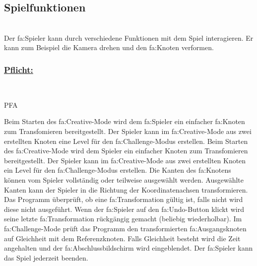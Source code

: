 %
%


\subsection{Spielfunktionen}

%
%
\renewcommand{\K}{}
%
%

~\\
Der \gls{fa:Spieler} kann durch verschiedene Funktionen mit dem Spiel interagieren. Er kann zum Beispiel die Kamera drehen und den \gls{fa:Knoten} verformen. 
\\

%
%
\subsubsection*{\underline{Pflicht:}}~\\

\begin{ids}{\gls{PFA\K}}

	\id[ 90] Beim Starten des \gls{fa:Creative}-Mode wird dem \gls{fa:Spieler} ein einfacher \gls{fa:Knoten} zum Transfomieren bereitgestellt.
 	\id[100] Der Spieler kann im \gls{fa:Creative}-Mode aus zwei erstellten Knoten eine Level für den \gls{fa:Challenge}-Modus erstellen.
 	\id[ 110] Beim Starten des \gls{fa:Creative}-Mode wird dem Spieler ein einfacher Knoten  zum Transfomieren bereitgestellt.
 	\id[ 120] Der Spieler kann im \gls{fa:Creative}-Mode aus zwei erstellten Knoten ein Level für den \gls{fa:Challenge}-Modus erstellen.
 	\id[ 130] Die Kanten des \gls{fa:Knoten}s können vom Spieler vollständig oder teilweise ausgewählt werden.
 	\id[ 140] Ausgewählte Kanten kann der Spieler in die Richtung der Koordinatenachsen transformieren.
 	\id[ 150] Das Programm überprüft, ob eine \gls{fa:Transformation} gültig ist, falls nicht wird diese nicht ausgeführt.
 	\id[ 160] Wenn der \gls{fa:Spieler} auf den \gls{fa:Undo}-Button klickt wird seine letzte \gls{fa:Transformation} rückgängig gemacht (beliebig wiederholbar). 
 	\id[ 170] Im \gls{fa:Challenge}-Mode prüft das Programm den transformierten \gls{fa:Ausgangsknoten} auf Gleichheit mit dem \gls{Referenzknoten}. Falls Gleichheit besteht wird die Zeit angehalten und der \gls{fa:Abschlussbildschirm} wird eingeblendet.
 	\id[ 180] Der \gls{fa:Spieler} kann das Spiel jederzeit beenden.
 	
 	
 	
	
\end{ids}

